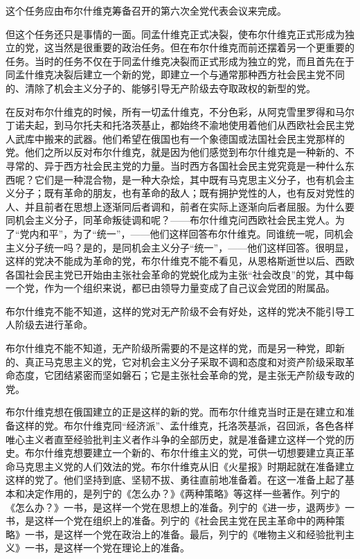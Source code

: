 这个任务应由布尔什维克筹备召开的第六次全党代表会议来完成。

但这个任务还只是事情的一面。同孟什维克正式决裂，使布尔什维克正式形成为独立的党，这当然是很重要的政治任务。但在布尔什维克而前还摆着另一个更重要的任务。当时的任务不仅在于同孟什维克决裂而正式形成为独立的党，而且首先在于同孟什维克决裂后建立一个新的党，即建立一个与通常那种西方社会民主党不同的、清除了机会主义分子的、能够引导无产阶级去夺取政权的新型的党。

在反对布尔什维克的时候，所有一切孟什维克，不分色彩，从阿克雪里罗得和马尔丁诺夫起，到马尔托夫和托洛茨基止，都始终不渝地使用着他们从西欧社会民主党人武库中搬来的武器。他们希望在俄国也有一个象德国或法国社会民主党那样的党。他们之所以反对布尔什维克，就是因为他们感觉到布尔什维克是一种新的、不寻常的、异于西方社会民主党的力量。当时西方各国社会民主党究竟是一种什么东西呢？它们是一种混合物，是一种大杂烩，其中既有马克思主义分子，也有机会主义分子；既有革命的朋友，也有革命的敌人；既有拥护党性的人，也有反对党性的人、并且前者在思想上逐渐同后者调和，前者在实际上逐渐向后者屈服。为什么要同机会主义分子，同革命叛徒调和呢？——布尔什维克问西欧社会民主党人。为了“党内和平”，为了“统一”，——他们这样回答布尔什维克。同谁统一呢，同机会主义分子统一吗？是的，是同机会主义分子“统一”，——他们这样回答。很明显，这样的党决不能成为革命的党，布尔什维克不能不看见，从恩格斯逝世以后、西欧各国社会民主党已开始由主张社会革命的党蜕化成为主张“社会改良”的党，其中每一个党，作为一个组织来说，都已由领导力量变成了自己议会党团的附属品。

布尔什维克不能不知道，这样的党对无产阶级不会有好处，这样的党决不能引导工人阶级去进行革命。

布尔什维克不能不知道，无产阶级所需要的不是这样的党，而是另一种党，即新的、真正马克思主义的党，它对机会主义分子采取不调和态度和对资产阶级采取革命态度，它团结紧密而坚如磐石；它是主张社会革命的党，是主张无产阶级专政的党。

布尔什维克想在俄国建立的正是这样的新的党。而布尔什维克当时正是在建立和准备这样的党。布尔什维克同“经济派”、孟什维克，托洛茨基派，召回派，各色各样唯心主义者直至经验批判主义者作斗争的全部历史，就是准备建立这样一个党的历史。布尔什维克想要建立一个新的、布尔什维主义的党，可供一切想要建立真正革命马克思主义党的人们效法的党。布尔什维克从旧《火星报》时期起就在准备建立这样的党了。他们坚持到底、坚韧不拔、勇往直前地准备着。在这一准备上起了基本和决定作用的，是列宁的《怎么办？》《两种策略》等这样一些著作。列宁的《怎么办？》一书，是这样一个党在思想上的准备。列宁的《进一步，退两步》一书，是这样一个党在组织上的准备。列宁的《社会民主党在民主革命中的两种策略》一书，是这样一个党在政治上的准备。最后，列宁的《唯物主义和经验批判主义》一书，是这样一个党在理论上的准备。

